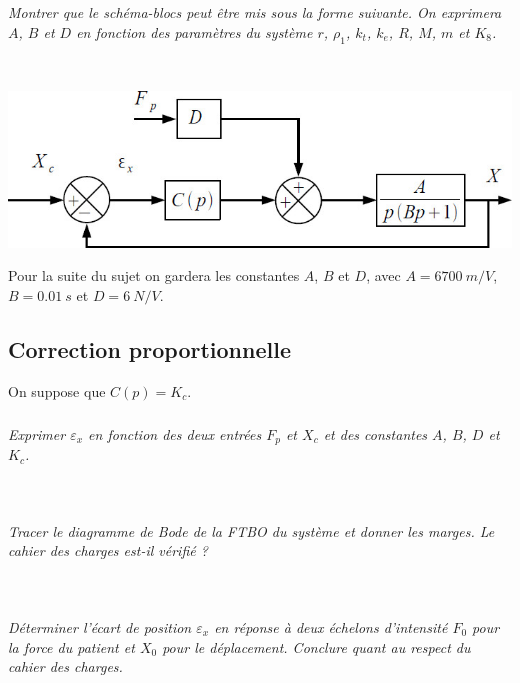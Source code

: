 \documentclass[10pt,fleqn]{article} %
\begin{document}
\begin{multicols}{2}
\subparagraph{}\textit{Montrer que le schéma-blocs peut être mis sous la forme suivante. On exprimera $A$, $B$ et $D$ en fonction des paramètres du système $r$, $\rho_1$, $k_t$, $k_e$, $R$, $M$, $m$ et $K_8$. }
\ifprof
\begin{corrige}~\\
\end{corrige}
\else
\fi

\begin{center}
\includegraphics[width=\linewidth]{images/fig_05}
\end{center}

Pour la suite du sujet on gardera les constantes $A$, $B$ et $D$, avec $A=\SI{6700}{m/V}$, $B=\SI{0,01}{s}$ et $D=\SI{6}{N/V}$.


\subsection*{Correction proportionnelle}

On suppose que $C(p)=K_c$. 


\subparagraph{}\textit{Exprimer $\varepsilon_x$ en fonction des deux entrées $F_p$ et $X_c$ et des constantes $A$, $B$, $D$ et $K_c$.}
\ifprof
\begin{corrige}~\\
\end{corrige}
\else
\fi


\subparagraph{}\textit{Tracer le diagramme de Bode de la FTBO du système et donner les marges. Le cahier des charges est-il vérifié ?}
\ifprof
\begin{corrige}~\\
\end{corrige}
\else
\fi

\subparagraph{}\textit{Déterminer l'écart de position $\varepsilon_x$ en réponse à deux échelons d'intensité $F_0$ pour la force du patient et $X_0$ pour le déplacement. Conclure quant au respect du cahier des charges.}
\ifprof
\begin{corrige}~\\
\end{corrige}
\else
\fi


\end{multicols}
\end{document}
